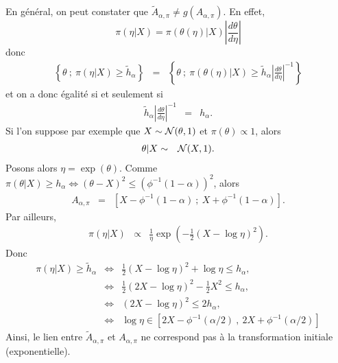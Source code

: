 \begin{rep}%

En général, on peut constater que $\tilde{A}_{\alpha,\pi}\neq g\left(A_{\alpha,\pi}\right)$. En effet,
$$
\pi(\eta|X) = \pi(\theta(\eta)|X) \left| \frac{d\theta}{d\eta} \right|
$$
donc 
\begin{eqnarray*}
\left\{\theta \ ; \ \pi(\eta|X)\geq \tilde{h}_{\alpha}\right\} &= & \left\{\theta \ ; \ \pi(\theta(\eta)|X)\geq \tilde{h}_{\alpha}  \left| \frac{d\theta}{d\eta} \right|^{-1}\right\} 
\end{eqnarray*}
et on a donc égalité si et seulement si
\begin{eqnarray*}
\tilde{h}_{\alpha}  \left| \frac{d\theta}{d\eta} \right|^{-1} & = & {h}_{\alpha}.
\end{eqnarray*}
Si l'on suppose par exemple que $X\sim{\cal{N}}(\theta,1)$ et $\pi(\theta)\propto 1$, alors
\begin{eqnarray*}
\theta|X & \sim & {\cal{N}}(X,1).
\end{eqnarray*}
Posons alors $\eta=\exp(\theta)$. 
Comme $\pi(\theta|X)\geq h_{\alpha} \Leftrightarrow (\theta-X)^2 \leq \left(\phi^{-1}(1-\alpha)\right)^2$, alors
\begin{eqnarray*}
A_{\alpha,\pi} & = & \left[X-\phi^{-1}(1-\alpha) \ ; \ X+\phi^{-1}(1-\alpha)\right].
\end{eqnarray*}
Par ailleurs, 
\begin{eqnarray*}
\pi(\eta|X) & \propto & \frac{1}{\eta} \exp\left(-\frac{1}{2}\left(X-\log \eta \right)^2 \right).
\end{eqnarray*}
Donc
\begin{eqnarray*}
\pi(\eta|X)  \geq  \tilde{h}_{\alpha}  & \Leftrightarrow & \frac{1}{2}\left(X-\log \eta \right)^2 + \log \eta \leq {h}_{\alpha}, \\
&  \Leftrightarrow & \frac{1}{2}\left(2X-\log \eta\right)^2 - \frac{1}{2} X^2 \leq {h}_{\alpha}, \\
& \Leftrightarrow & \left(2X-\log \eta\right)^2 \leq 2{h}_{\alpha}, \\
& \Leftrightarrow &  \log\eta \in \left[2X-\phi^{-1}(\alpha/2) \ , \ 2X+\phi^{-1}(\alpha/2)\right]
\end{eqnarray*}
Ainsi, le lien entre $\tilde{A}_{\alpha,\pi}$ et $A_{\alpha,\pi}$ ne correspond pas à
la transformation initiale (exponentielle). 
\end{rep}